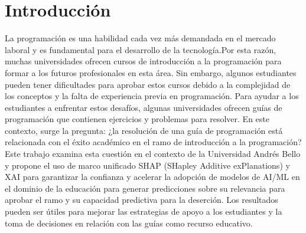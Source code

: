 \hypertarget{Introducción}{%
    \section{Introducción}\label{Introducción}}
La programación es una habilidad cada vez más demandada en el mercado laboral y es fundamental para el desarrollo de la tecnología.Por esta razón, muchas universidades ofrecen cursos de introducción a la programación para formar a los futuros profesionales en esta área. Sin embargo, algunos estudiantes pueden tener dificultades para aprobar estos cursos debido a la complejidad de los conceptos y la falta de experiencia previa en programación. Para ayudar a los estudiantes a enfrentar estos desafíos, algunas universidades ofrecen guías de programación que contienen ejercicios y problemas para resolver. En este contexto, surge la pregunta: ¿la resolución de una guía de programación está relacionada con el éxito académico en el ramo de introducción a la programación? Este trabajo examina esta cuestión en el contexto de la Universidad Andrés Bello y propone el uso de marco unificado SHAP (SHapley Additive exPlanations) y XAI para garantizar la confianza y acelerar la adopción de modelos de AI/ML en el dominio de la educación para generar predicciones sobre su relevancia para aprobar el ramo y su capacidad predictiva para la deserción. Los resultados pueden ser útiles para mejorar las estrategias de apoyo a los estudiantes y la toma de decisiones en relación con las guías como recurso educativo.